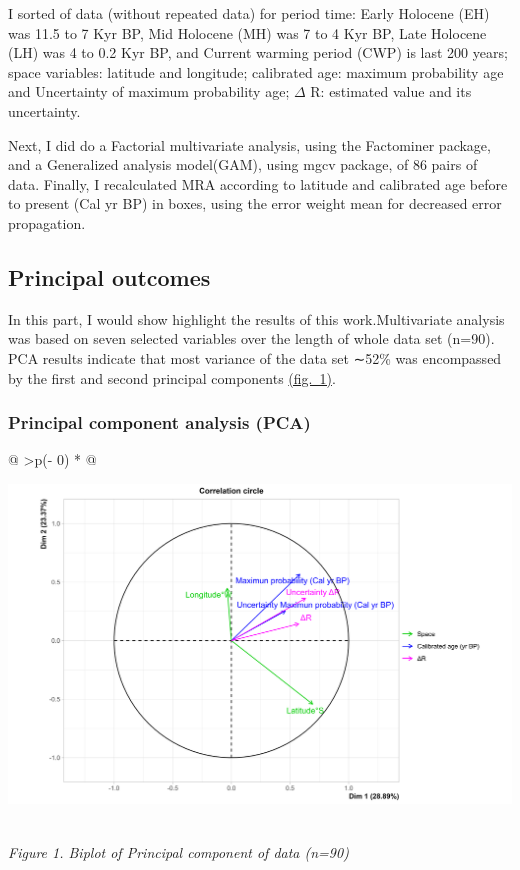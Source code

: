 \documentclass[
]{article}
\begin{document}
I sorted of data (without repeated data) for period time: Early Holocene
(EH) was 11.5 to 7 Kyr BP, Mid Holocene (MH) was 7 to 4 Kyr BP, Late
Holocene (LH) was 4 to 0.2 Kyr BP, and Current warming period (CWP) is
last 200 years; space variables: latitude and longitude; calibrated age:
maximum probability age and Uncertainty of maximum probability age;
\(\Delta\) R: estimated value and its uncertainty.

Next, I did do a Factorial multivariate analysis, using the Factominer
package, and a Generalized analysis model(GAM), using mgcv package, of
86 pairs of data. Finally, I recalculated MRA according to latitude and
calibrated age before to present (Cal yr BP) in boxes, using the error
weight mean for decreased error propagation.

\hypertarget{principal-outcomes}{%
\subsection{Principal outcomes}\label{principal-outcomes}}

In this part, I would show highlight the results of this
work.Multivariate analysis was based on seven selected variables over
the length of whole data set (n=90). PCA results indicate that most
variance of the data set ∼52\% was encompassed by the first and second
principal components
\protect\hyperlink{principal-component-analysis-ux28pcaux29}{(fig.~1)}.

\hypertarget{principal-component-analysis-pca}{%
\subsubsection{Principal component analysis
(PCA)}\label{principal-component-analysis-pca}}

\begin{longtable}[]{@{}
  >{\centering\arraybackslash}p{(\columnwidth - 0\tabcolsep) * }@{}}
\toprule
\begin{minipage}[b]{\linewidth}\centering
\href{https://github.com/jasb3110/Radiocarbon-reservoir/blob/db842ff0620d55ea5ca5ceec0d96a369406b6e3c/AMV.biplot.png?raw=true}{\includegraphics{AMV.biplot.png}}
\end{minipage} \\
\midrule
\endhead
\emph{Figure 1. Biplot of Principal component of data (n=90)} \\
\bottomrule
\end{longtable}
\end{document}
